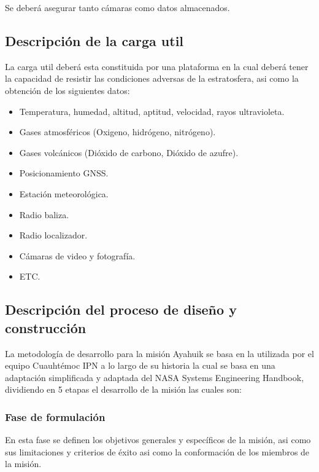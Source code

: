 \documentclass[letterpaper,12pt]{article} %
\begin{document}
    \medskip   \qquad Se deberá asegurar tanto cámaras como datos almacenados.

    \subsection{Descripción de la carga util}

    La carga util deberá esta constituida por una plataforma en la cual deberá tener 
    la capacidad de resistir las condiciones adversas de la estratosfera, asi como la obtención
    de los siguientes datos:

    \begin{itemize}
        \item Temperatura, humedad, altitud, aptitud, velocidad, rayos ultravioleta.
        \item Gases atmosféricos (Oxigeno, hidrógeno, nitrógeno).
        \item Gases volcánicos (Dióxido de carbono, Dióxido de azufre).
        \item Posicionamiento GNSS.
        \item Estación meteorológica.
        \item Radio baliza.
        \item Radio localizador.
        \item Cámaras de video y fotografía.
        \item ETC. 
    \end{itemize}

    \subsection{Descripción del proceso de diseño y construcción}

    La metodología de desarrollo para la misión Ayahuik se basa en la utilizada por el equipo Cuauhtémoc IPN a lo largo de su historia
    la cual se basa en una adaptación simplificada y adaptada del NASA Systems Engineering Handbook, dividiendo en 5 etapas el desarrollo de
    la misión las cuales son: 
    
    \subsubsection{Fase de formulación}
        En esta fase se definen los objetivos generales y específicos de la misión, asi como sus limitaciones 
        y criterios de éxito asi como la conformación de los miembros de la misión.
\end{document}
